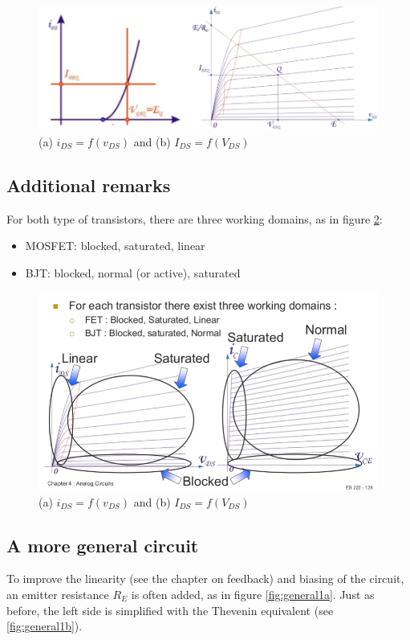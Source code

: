  \begin{figure}[h!]
 	\centering
 	\includegraphics[width=14cm]{figures/ch02/mos_load2.jpg}
 	\caption{(a) $i_{DS} = f(v_{DS})$ and (b) $I_{DS} = f(V_{DS})$}
 	\label{fig:mos_load2}
 \end{figure}


 \subsection{Additional remarks}
 For both type of transistors, there are three working domains, as in figure \ref{fig:transistor_overview}:
 \begin{itemize}
 	\item MOSFET: blocked, saturated, linear
 	\item BJT: blocked, normal (or active), saturated
 \end{itemize}
\begin{figure}[h!]
	\centering
	\includegraphics[width=12cm]{figures/ch02/overview.jpg}
	\caption{(a) $i_{DS} = f(v_{DS})$ and (b) $I_{DS} = f(V_{DS})$}
	\label{fig:transistor_overview}
\end{figure}
\subsection{A more general circuit}
\label{sec:general_circuit}
To improve the linearity (see the chapter on feedback) and biasing of the circuit, an emitter resistance $R_E$ is often added, as in figure \ref{fig:general1a}. Just as before, the left side is simplified with the Thevenin equivalent (see \ref{fig:general1b}).

